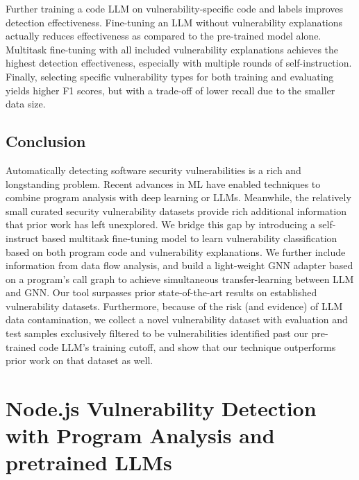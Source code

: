 \documentclass[12pt,openany,oneside,table]{cmuthesis}
\begin{document}
\begin{tcolorbox}
[colback=white,colframe=black,arc=0pt,boxrule=0.5pt,title=RQ3 Summary,boxsep=2pt,left=1pt,right=1pt,top=1pt,bottom=1pt,fonttitle=\bfseries]
Further training a code LLM on vulnerability-specific code and labels improves detection effectiveness. Fine-tuning an LLM without vulnerability explanations actually reduces effectiveness as compared to the pre-trained model alone. Multitask fine-tuning with all included vulnerability explanations achieves the highest detection effectiveness, especially with multiple rounds of self-instruction. Finally, selecting specific vulnerability types for both training and evaluating yields higher F1 scores, but with a trade-off of lower recall due to the smaller data size.
\end{tcolorbox}

\section{Conclusion}
Automatically detecting software security vulnerabilities is a rich and longstanding problem. Recent advances in ML have enabled techniques to combine program analysis with deep learning or LLMs.
Meanwhile, the relatively small curated security vulnerability datasets provide rich additional information that prior work has left unexplored. We bridge this gap by introducing a self-instruct based multitask fine-tuning model to learn vulnerability classification based on both program code and vulnerability explanations. We further include information from data flow analysis, and build a light-weight GNN adapter based on a program's call graph to achieve simultaneous transfer-learning between LLM and GNN. 
Our tool surpasses prior state-of-the-art results on established vulnerability datasets. Furthermore, because of the risk (and evidence) of LLM data contamination, we collect a novel vulnerability dataset with evaluation and test samples  exclusively filtered to be vulnerabilities identified past our pre-trained code LLM's training cutoff, and show that our technique outperforms prior work on that dataset as well. 

\chapter{Node.js Vulnerability Detection with Program Analysis and pretrained LLMs}
\end{document}
